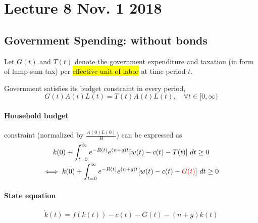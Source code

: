 \documentclass[]{article}
\begin{document}
	\newpage
	\section{Lecture 8 Nov. 1 2018}
		\subsection{Government Spending: without bonds}
			\begin{notation}
				Let $G(t)$ and $T(t)$ denote the government expenditure and taxation (in form of lump-sum tax) per \hl{effective unit of labor} at time period $t$.
			\end{notation}
			
			\begin{assumption}
				Government satisfies its budget constraint in every period,
				\begin{equation}
					G(t) A(t) L(t) = T(t) A(t) L(t),\quad \forall t \in [0, \infty)
				\end{equation}
			\end{assumption}
			
			\paragraph{Household budget} constraint (normalized by $\frac{A(0)L(0)}{H}$) can be expressed as
			\begin{gather}
				k(0) + \int_{t=0}^\infty {e^{-R(t)} e^{(n+g)t} [w(t) - c(t) - T(t)]}\ dt \geq 0 \\
				\iff k(0) + \int_{t=0}^\infty {e^{-R(t)} e^{(n+g)t} [w(t) - c(t) - \textcolor{red}{G(t)}]}\ dt \geq 0
			\end{gather}
			
			\paragraph{State equation} 
			\begin{equation}
				\dot{k}(t) = f(k(t)) - c(t) - G(t) - (n+g)k(t)
			\end{equation}
			
\end{document}

